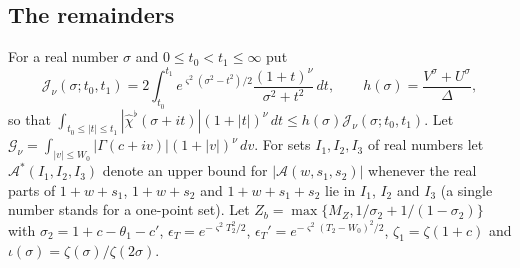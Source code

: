 \documentclass[11pt]{amsart}
\numberwithin{equation}{section}
\theoremstyle{definition}
\theoremstyle{remark}
\begin{document}
\subsection{The remainders}

For a real number $\sigma$ and $0 \leq t_0 < t_1 \leq \infty$ put
\[
\mathcal J_\nu(\sigma; t_0, t_1) = 2\int_{t_0}^{t_1}e^{\varsigma^2(\sigma^2 - t^2)/2}\frac{(1 + t)^\nu}{\sigma^2 + t^2}\,dt, \qquad h(\sigma) = \frac{V^\sigma + U^\sigma}{\Delta},
\]
so that $\int_{t_0\leq|t|\leq t_1}|\hat\chi^\flat(\sigma + it)|(1 + |t|)^\nu\,dt \leq h(\sigma)\mathcal J_\nu(\sigma; t_0, t_1)$.
Let $\mathcal G_\nu = \int_{|v|\leq W_0}|\Gamma(c + iv)|(1 + |v|)^\nu\,dv$.
For sets $I_1, I_2, I_3$ of real numbers let $\mathcal A^*(I_1, I_2, I_3)$ denote an upper bound for $|\mathcal A(w, s_1, s_2)|$ whenever the real parts of $1 + w + s_1$, $1 + w + s_2$ and $1 + w + s_1 + s_2$ lie in $I_1$, $I_2$ and $I_3$ (a single number stands for a one-point set).
Let $Z_b = \max\{M_Z, 1/\sigma_2 + 1/(1 - \sigma_2)\}$ with $\sigma_2 = 1 + c - \theta_1 - c'$, $\epsilon_T = e^{-\varsigma^2T_2^2/2}$, $\epsilon_T' = e^{-\varsigma^2(T_2 - W_0)^2/2}$, $\zeta_1 = \zeta(1 + c)$ and $\iota(\sigma) = \zeta(\sigma)/\zeta(2\sigma)$.
\end{document}

